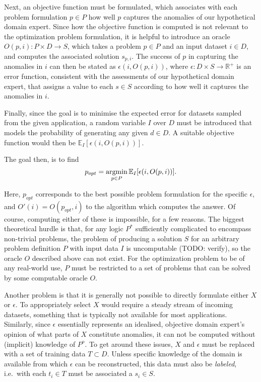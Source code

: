 Next, an objective function must be formulated, which associates with each problem formulation $p \in P$ how well $p$ captures the anomalies of our hypothetical domain expert. Since how the objective function is computed is not relevant to the optimization problem formulation, it is helpful to introduce an oracle $O(p, i): P \times D \rightarrow S$, which takes a problem $p \in P$ and an input dataset $i \in D$, and computes the associated solution $s_{p,i}$. The success of $p$ in capturing the anomalies in $i$ can then be stated as $\epsilon(i, O(p, i))$, where $\epsilon: D \times S \rightarrow \mathbb{R}^+$ is an error function, consistent with the assessments of our hypothetical domain expert, that assigns a value to each $s \in S$ according to how well it captures the anomalies in $i$.

Finally, since the goal is to minimise the expected error for datasets sampled from the given application, a random variable $I$ over $D$ must be introduced that models the probability of generating any given $d \in D$. A suitable objective function would then be $\mathbb{E}_I [\epsilon(i, O(p, i))]$.

The goal then, is to find 
\[
    p_{opt} = \argmin_{p \in P}\mathbb{E}_I [ \epsilon(i, O(p, i)) ].
\]

Here, $p_{opt}$ corresponds to the best possible problem formulation for the specific $\epsilon$, and $O'(i) = O(p_{opt}, i)$ to the algorithm which computes the answer. Of course, computing either of these is impossible, for a few reasons. The biggest theoretical hurdle is that, for any logic $P^*$ sufficiently complicated to encompass non-trivial problems, the problem of producing a solution $S$ for an arbitrary problem definition $P$ with input data $I$ is uncomputable (TODO: verify), so the oracle $O$ described above can not exist. For the optimization problem to be of any real-world use, $P$ must be restricted to a set of problems that can be solved by some computable oracle $O$.

Another problem is that it is generally not possible to directly formulate either $X$ or $\epsilon$. To appropriately select $X$ would require a steady stream of incoming datasets, something that is typically not available for most applications. Similarly, since $\epsilon$ essentially represents an idealised, objective domain expert's opinion of what parts of $X$ constitute anomalies, it can not be computed without (implicit) knowledge of $P^o$. To get around these issues, $X$ and $\epsilon$ must be replaced with a set of training data $T \subset D$. Unless specific knowledge of the domain is available from which $\epsilon$ can be reconstructed, this data must also be \emph{labeled}, i.e.\ with each $t_i \in T$ must be associated a $s_i \in S$.

